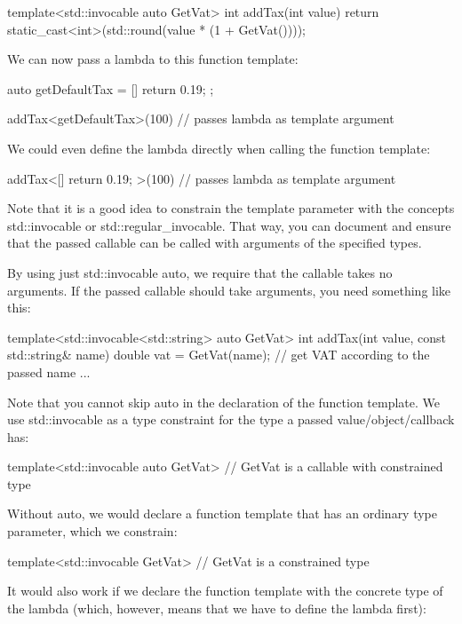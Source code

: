 \begin{cpp}
template<std::invocable auto GetVat>
int addTax(int value)
{
	return static_cast<int>(std::round(value * (1 + GetVat())));
}
\end{cpp}

We can now pass a lambda to this function template:

\begin{cpp}
auto getDefaultTax = [] {
	return 0.19;
};

addTax<getDefaultTax>(100) // passes lambda as template argument
\end{cpp}

We could even define the lambda directly when calling the function template:

\begin{cpp}
addTax<[]{ return 0.19; }>(100) // passes lambda as template argument
\end{cpp}

Note that it is a good idea to constrain the template parameter with the concepts std::invocable or std::regular\_invocable. That way, you can document and ensure that the passed callable can be called with arguments of the specified types.

By using just std::invocable auto, we require that the callable takes no arguments. If the passed callable should take arguments, you need something like this:

\begin{cpp}
template<std::invocable<std::string> auto GetVat>
int addTax(int value, const std::string& name)
{
	double vat = GetVat(name); // get VAT according to the passed name
	...
}
\end{cpp}

Note that you cannot skip auto in the declaration of the function template. We use std::invocable as a type constraint for the type a passed value/object/callback has:

\begin{cpp}
template<std::invocable auto GetVat> // GetVat is a callable with constrained type
\end{cpp}

Without auto, we would declare a function template that has an ordinary type parameter, which we constrain:

\begin{cpp}
template<std::invocable GetVat> // GetVat is a constrained type
\end{cpp}

It would also work if we declare the function template with the concrete type of the lambda (which, however, means that we have to define the lambda first):

